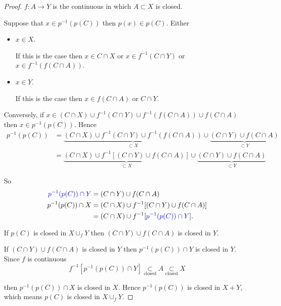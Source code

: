 \begin{proof}
	\( f: A \to Y \) is the continuous in which \( A \subset X \) is closed.

	Suppose that \( x \in p^{-1}(p(C)) \) then \( p(x) \in p(C) \). Either
	\begin{itemize}
		\item \( x \in X \).

		      If this is the case then \( x \in C \cap X \) or \( x \in f^{-1}(C \cap Y) \) or \( x \in f^{-1}(f(C \cap A)) \).
		\item \( x \in Y \).

		      If this is the case then \( x \in f(C \cap A) \) or \( C \cap Y \).
	\end{itemize}

	Conversely, if \( x \in (C \cap X) \cup f^{-1}(C \cap Y) \cup f^{-1}(f(C \cap A)) \cup f(C \cap A) \) then \( x \in p^{-1}(p(C)) \). Hence
	\begingroup
	\allowdisplaybreaks%
	\begin{align*}
		p^{-1}(p(C)) & = \underbrace{(C \cap X) \cup f^{-1}(C \cap Y) \cup f^{-1}(f(C \cap A))}_{\subset X} \cup \underbrace{(C \cap Y) \cup f(C \cap A)}_{\subset Y} \\
		             & = \underbrace{(C \cap X) \cup f^{-1}[(C \cap Y) \cup f(C \cap A)]}_{\subset X} \cup \underbrace{(C \cap Y) \cup f(C \cap A)}_{\subset Y}
	\end{align*}
	\endgroup

	So
	\begingroup
	\allowdisplaybreaks%
	\begin{align*}
		\textcolor{blue}{p^{-1}(p(C)) \cap Y} & = (C \cap Y) \cup f(C \cap A)                                    \\
		p^{-1}(p(C)) \cap X                   & = (C \cap X) \cup f^{-1}[(C \cap Y) \cup f(C \cap A)]            \\
		                                      & = (C \cap X) \cup f^{-1}[\textcolor{blue}{p^{-1}(p(C)) \cap Y}].
	\end{align*}
	\endgroup

	If \( p(C) \) is closed in \( X \cup_{f} Y \) then \( (C \cap Y) \cup f(C \cap A) \) is closed in \( Y \).

	If \( (C \cap Y) \cup f(C \cap A) \) is closed in \( Y \) then \( p^{-1}(p(C)) \cap Y \) is closed in \( Y \). Since \( f \) is continuous
	\[
		f^{-1}[p^{-1}(p(C)) \cap Y] \operatorname{\subset}\limits_{\text{closed}} A \operatorname{\subset}\limits_{\text{closed}} X
	\]

	then \( p^{-1}(p(C)) \cap X \) is closed in \( X \). Hence \( p^{-1}(p(C)) \) is closed in \( X + Y \), which means \( p(C) \) is closed in \( X \cup_{f} Y \).
\end{proof}

